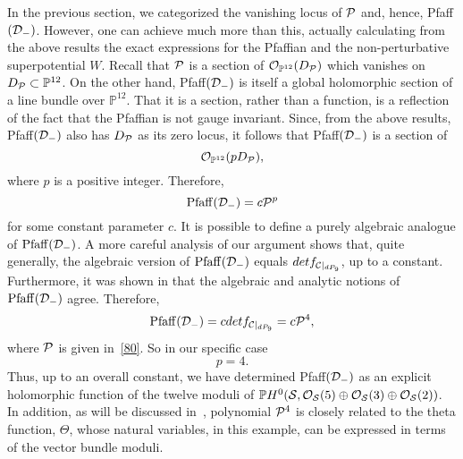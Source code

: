 \documentclass[a4paper,12pt]{article}
\numberwithin{equation}{section}
\theoremstyle{plain}
\begin{document}
In the previous section, we categorized the vanishing locus of ${\cal{P}}$
and,
hence, Pfaff$({\cal{D}}_{-})$. However, one can achieve much more than
this,
actually calculating from the above results the exact expressions for the
Pfaffian and the non-perturbative superpotential $W$. Recall that
${\cal{P}}$ is a section of ${\cal O}_{{\mathbb P}^{12}}(D_{{\cal{P}}})$
which vanishes on $D_{{\cal{P}}} \subset {\mathbb P}^{12}$.
On the other hand, Pfaff$({\cal{D}}_{-})$ is itself a
global holomorphic section of a line bundle over ${\mathbb P}^{12}$. That
it is a section, rather than a function, is a reflection of the fact that
the Pfaffian is not gauge invariant. Since, from the above results,
Pfaff$({\cal{D}}_{-})$ also has $D_{{\cal{P}}}$ as its zero locus, it
follows
that Pfaff$({\cal{D}}_{-})$ is a section of
%
\begin{equation}
{\cal O}_{{\mathbb P}^{12}}(pD_{{\cal{P}}}),
\label{83}
\end{equation}
%
where $p$ is a positive integer. Therefore,
%
\begin{equation}
{\rm Pfaff}({\cal{D}}_{-})=c{\cal{P}}^{p}
\label{83a}
\end{equation}
%
for some constant parameter $c$. 
It is possible to define a purely algebraic analogue of
${\rm Pfaff}({\cal{D}}_{-})$. A more careful analysis of our argument shows
that, quite generally, the algebraic version of
${\rm Pfaff}({\cal{D}}_{-})$ equals 
$detf_{{\cal{C}}|_{dP_{9}}}$, up to a constant. Furthermore, it was shown
in \cite{Bismut1,Bismut2,Bismut3} that the algebraic and analytic notions 
of ${\rm Pfaff}({\cal{D}}_{-})$ agree. Therefore,
%
\begin{equation}
{\rm Pfaff}({\cal{D}}_{-})=cdetf_{{\cal{C}}|_{dP_{9}}}=
c{\cal{P}}^{4},
\label{83.b}
\end{equation}
%
where ${\cal{P}}$ is given in~\eqref{80}. So in our specific case 
%
\begin{equation}
p=4.
\label{85}
\end{equation}
%
Thus, up to an overall
constant, we have determined Pfaff$({\cal{D}}_{-})$ as an explicit
holomorphic
function of the twelve moduli of ${\mathbb P}H^{0}
({\cal S}, {\cal O}_{{\cal S}}(5) \oplus {\cal O}_{{\cal S}}(3) \oplus
{\cal O}_{{\cal S}}(2))$. In addition, as will be discussed
in~\cite{BDOnew},
polynomial ${\cal{P}}^{4}$ is closely related to the theta function, $\Theta$,
whose natural variables, in this example, can be expressed in terms of the
vector bundle moduli.
\end{document}

